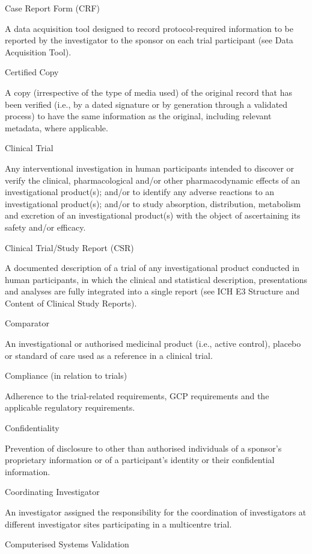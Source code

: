 \documentclass[11pt]{article}
\begin{document}
Case Report Form (CRF)


A data acquisition tool designed to record protocol-required information to be reported by the investigator to the sponsor on each trial participant (see Data Acquisition Tool).


Certified Copy


A copy (irrespective of the type of media used) of the original record that has been verified (i.e., by a dated signature or by generation through a validated process) to have the same information as the original, including relevant metadata, where applicable.


Clinical Trial


Any interventional investigation in human participants intended to discover or verify the clinical, pharmacological and/or other pharmacodynamic effects of an investigational product(s); and/or to identify any adverse reactions to an investigational product(s); and/or to study absorption, distribution, metabolism and excretion of an investigational product(s) with the object of ascertaining its safety and/or efficacy.


Clinical Trial/Study Report (CSR)


A documented description of a trial of any investigational product conducted in human participants, in which the clinical and statistical description, presentations and analyses are fully integrated into a single report (see ICH E3 Structure and Content of Clinical Study Reports).


Comparator


An investigational or authorised medicinal product (i.e., active control), placebo or standard of care used as a reference in a clinical trial.


Compliance (in relation to trials)


Adherence to the trial-related requirements, GCP requirements and the applicable regulatory requirements.


Confidentiality


Prevention of disclosure to other than authorised individuals of a sponsor's proprietary information or of a participant's identity or their confidential information.


Coordinating Investigator


An investigator assigned the responsibility for the coordination of investigators at different investigator sites participating in a multicentre trial.


Computerised Systems Validation
\end{document}
